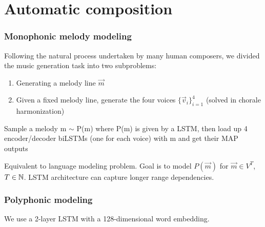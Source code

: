 \chapter{Automatic composition}

\subsection{Monophonic melody modeling}

Following the natural process undertaken by many human composers, we divided
the music generation task into two subproblems:
\begin{enumerate}
    \item Generating a melody line $\vec{m}$
    \item Given a fixed melody line, generate the four voices $\{\vec{v}_i\}_{i=1}^4$ (solved in chorale harmonization)
\end{enumerate}

Sample a melody m $\sim$ P(m) where P(m) is given by a LSTM, then load up 4
encoder/decoder biLSTMs (one for each voice) with m and get their MAP outputs

Equivalent to language modeling problem. Goal is to model $P(\vec{m})$ for $\vec{m}
\in V^T$, $T \in \mathbb{N}$. LSTM architecture can capture longer range dependencies.

\subsection{Polyphonic modeling}

We use a 2-layer LSTM with a 128-dimensional word embedding.

